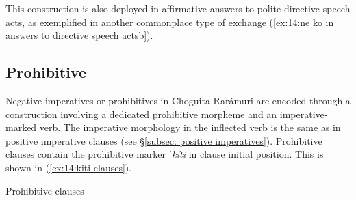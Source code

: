 \z

This construction is also deployed in affirmative answers to polite directive speech acts, as exemplified in another commonplace type of exchange (\ref{ex:14:ne ko in answers to directive speech actsb}).

\ea\label{ex:14:ne ko in answers to directive speech acts}

    \label{ex:14:ne ko in answers to directive speech actsa}
        \label{ex:14:ne ko in answers to directive speech actsb}
    \z
\z

\subsection{Prohibitive}
\label{subsec: prohibitives}

Negative imperatives or prohibitives in Choguita Rarámuri are encoded through a construction involving a dedicated prohibitive morpheme and an imperative-marked verb. The imperative morphology in the inflected verb is the same as in positive imperative clauses (see §\ref{subsec: positive imperatives}). Prohibitive clauses contain the prohibitive marker \textit{ˈkíti} in clause initial position. This is shown in (\ref{ex:14:kiti clauses}).

\ea\label{ex:14:kiti clauses}
{Prohibitive clauses}

